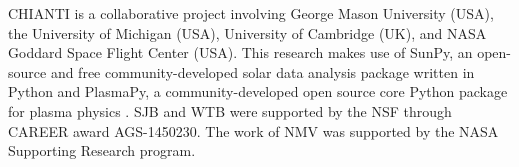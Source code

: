 \documentclass[preprint2]{aastex62}
\begin{document}





\acknowledgments
CHIANTI is a collaborative project involving George Mason University (USA), the University of Michigan (USA), University of Cambridge (UK), and NASA Goddard Space Flight Center (USA). This research makes use of SunPy, an open-source and free community-developed solar data analysis package written in Python \citep{sunpy_community_sunpypython_2015} and PlasmaPy, a community-developed open source core Python package for plasma physics \citep{plasmapy_community_2018_1238132}. SJB and WTB were supported by the NSF through CAREER award AGS-1450230. The work of NMV was supported by the NASA Supporting Research program.
\appendix




\listofchanges
\end{document}
